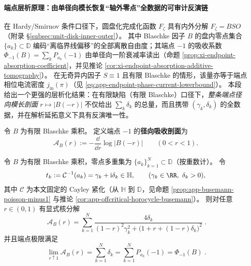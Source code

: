 \paragraph{端点层析原理：由单径向模长恢复“轴外零点”全数据的可审计反演链}\label{par:xi-endpoint-tomography-principle}
在 Hardy/Smirnov 条件口径下，圆盘化完成化函数 \(F_{\zeta}\) 具有内外分解 \(F_{\zeta}=BSO\)（附录 \S\ref{subsec:unit-disk-inner-outer}）。
其中 Blaschke 因子 \(B\) 的盘内零点集合 \(\{a_k\}\subset\mathbb{D}\) 编码“离临界线偏移”的全部离散自由度；其端点 \(-1\) 的吸收系数
\(\Phi_{-1}(B)=\sum_k P_{a_k}(-1)\)
由单径向一阶衰减率读出（命题 \ref{prop:xi-endpoint-absorption-coefficient}，并见推论 \ref{cor:xi-endpoint-absorption-additive-tomography}）。
在无奇异内因子 \(S\equiv 1\) 且有限 Blaschke 的情形，该量亦等于端点相位电流密度 \(j_{\mathrm{in}}(\pi)\)（见 \eqref{eq:app-endpoint-phase-current-lowerbound}）。
本段给出一个更强的层析化结果：在有限缺陷（有限 Blaschke）口径下，\emph{整条端点径向模长剖面}
\(
r\mapsto |B(-r)|
\)
不仅给出 \(\sum_k\delta_k\) 的总量，而且携带 \((\gamma_k,\delta_k)\) 的全数据，并在解析延拓意义下具有反演唯一性。

\begin{definition}[端点径向吸收剖面]\label{def:xi-endpoint-radial-absorption-profile}
令 \(B\) 为有限 Blaschke 乘积。
定义端点 \(-1\) 的\textbf{径向吸收剖面}为
\begin{equation}\label{eq:xi-endpoint-radial-absorption-profile}
\boxed{\;
\mathcal{A}_B(r):=-\frac{\dd}{\dd r}\log|B(-r)|
\qquad(0<r<1).\;}
\end{equation}
\end{definition}

\begin{theorem}\label{thm:xi-endpoint-absorption-kernel-representation}
令 \(B\) 为有限 Blaschke 乘积，零点多重集为 \(\{a_k\}_{k=1}^{N}\subset\mathbb{D}\)（按重数计）。
令
\[
t_k:=\mathcal{C}^{-1}(a_k)=\gamma_k+\mathrm{i}\delta_k\in\mathbb{H},
\qquad (\gamma_k\in\RR,\ \delta_k>0),
\]
其中 \(\mathcal{C}\) 为本文固定的 Cayley 紧化（从 \(\mathbb{H}\) 到 \(\mathbb{D}\)，见命题 \ref{prop:app-busemann-poisson-minus1} 与推论 \ref{cor:app-offcritical-horocycle-busemann}）。
则对任意 \(r\in(0,1)\) 有显式核分解
\begin{equation}\label{eq:xi-endpoint-absorption-kernel-sum}
\boxed{\;
\mathcal{A}_B(r)
=\sum_{k=1}^{N}
\frac{4\delta_k}{(1-r)^2\gamma_k^2+\bigl(1+r+(1-r)\delta_k\bigr)^2}\; }.
\end{equation}
并且端点极限满足
\begin{equation}\label{eq:xi-endpoint-absorption-kernel-limit}
\boxed{\;
\lim_{r\uparrow 1}\mathcal{A}_B(r)
=\sum_{k=1}^{N}\delta_k
=\sum_{k=1}^{N}P_{a_k}(-1)
=\Phi_{-1}(B)\; }.
\end{equation}
\end{theorem}

